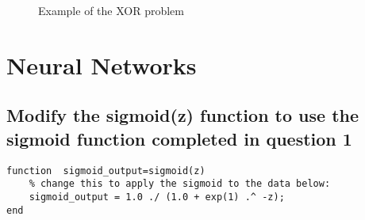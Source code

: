 \documentclass[titlepage]{scrartcl}
\begin{document}
\begin{figure}
    \caption{Example of the XOR problem}
    \label{XOR}
\end{figure}

\section{Neural Networks}
\subsection{Modify the sigmoid(z) function to use the sigmoid function
completed in question 1}
\begin{lstlisting}
function  sigmoid_output=sigmoid(z)
    % change this to apply the sigmoid to the data below:
    sigmoid_output = 1.0 ./ (1.0 + exp(1) .^ -z);
end
\end{lstlisting}
\end{document}

